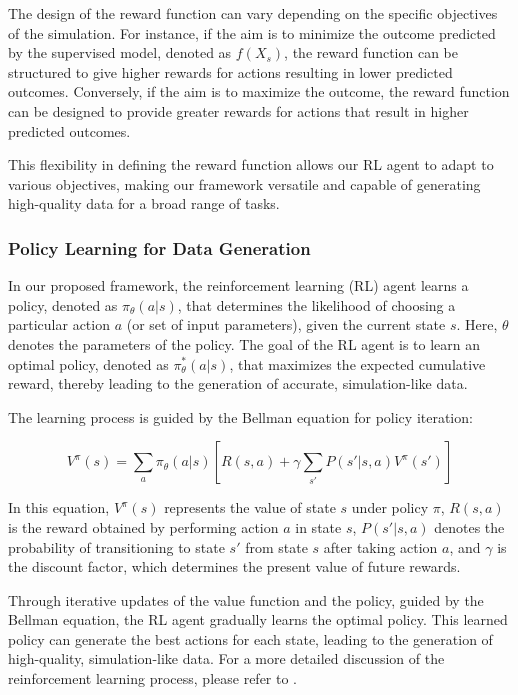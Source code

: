 \documentclass{article}
\begin{document}
The design of the reward function can vary depending on the specific objectives of the simulation. For instance, if the aim is to minimize the outcome predicted by the supervised model, denoted as $f(X_s)$, the reward function can be structured to give higher rewards for actions resulting in lower predicted outcomes. Conversely, if the aim is to maximize the outcome, the reward function can be designed to provide greater rewards for actions that result in higher predicted outcomes.

This flexibility in defining the reward function allows our RL agent to adapt to various objectives, making our framework versatile and capable of generating high-quality data for a broad range of tasks.

\subsubsection{Policy Learning for Data Generation}

In our proposed framework, the reinforcement learning (RL) agent learns a policy, denoted as $\pi_{\theta}(a|s)$, that determines the likelihood of choosing a particular action $a$ (or set of input parameters), given the current state $s$. Here, $\theta$ denotes the parameters of the policy. The goal of the RL agent is to learn an optimal policy, denoted as $\pi^*_{\theta}(a|s)$, that maximizes the expected cumulative reward, thereby leading to the generation of accurate, simulation-like data.

The learning process is guided by the Bellman equation for policy iteration:

\begin{equation}
    V^\pi(s) = \sum_{a} \pi_{\theta}(a|s) \left[R(s,a) + \gamma \sum_{s'} P(s'|s,a) V^\pi(s')\right]
\end{equation}

In this equation, $V^\pi(s)$ represents the value of state $s$ under policy $\pi$, $R(s,a)$ is the reward obtained by performing action $a$ in state $s$, $P(s'|s,a)$ denotes the probability of transitioning to state $s'$ from state $s$ after taking action $a$, and $\gamma$ is the discount factor, which determines the present value of future rewards.

Through iterative updates of the value function and the policy, guided by the Bellman equation, the RL agent gradually learns the optimal policy. This learned policy can generate the best actions for each state, leading to the generation of high-quality, simulation-like data. For a more detailed discussion of the reinforcement learning process, please refer to \cite{sutton2018reinforcement}.
\end{document}
